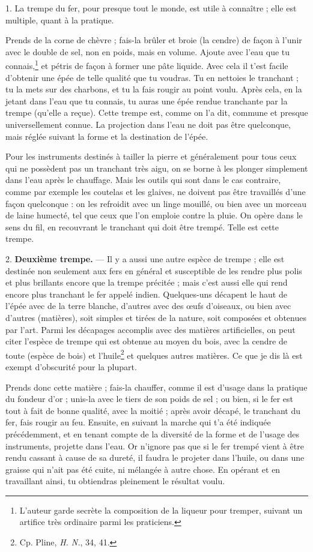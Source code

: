 \documentclass[a4paper, 11pt, oneside, polutonikogreek, french]{article}
\begin{document}
1. La trempe du fer, pour presque tout le monde, est utile à connaître ; elle est multiple, quant à la pratique.

Prends de la corne de chèvre ; fais-la brûler et broie (la cendre) de façon à l'unir avec le double de sel, non en poids, mais en volume. Ajoute avec l'eau que tu connais,\footnote{L'auteur garde secrète la composition de la liqueur pour tremper, suivant un artifice très ordinaire parmi les praticiens.} et pétris de façon à former une pâte liquide. Avec cela il t'est facile d'obtenir une épée de telle qualité que tu voudras. Tu en nettoies le tranchant ; tu la mets sur des charbons, et tu la fais rougir au point voulu. Après cela, en la jetant dans l'eau que tu connais, tu auras une épée rendue tranchante par la trempe (qu'elle a reçue). Cette trempe est, comme on l'a dit, commune et presque universellement connue. La projection dans l'eau ne doit pas être quelconque, mais réglée suivant la forme et la destination de l'épée.

Pour les instruments destinés à tailler la pierre et généralement pour tous ceux qui ne possèdent pas un tranchant très aigu, on se borne à les plonger simplement dans l'eau après le chauffage. Mais les outils qui sont dans le cas contraire, comme par exemple les coutelas et les glaives, ne doivent pas être travaillés d'une façon quelconque : on les refroidit avec un linge mouillé, ou bien avec un morceau de laine humecté, tel que ceux que l'on emploie contre la pluie. On opère dans le sens du fil, en recouvrant le tranchant qui doit être trempé. Telle est cette trempe.

2. \textbf{Deuxième trempe.} --- Il y a aussi une autre espèce de trempe ; elle est destinée non seulement aux fers en général et susceptible de les rendre plus polis et plus brillants encore que la trempe précitée ; mais c'est aussi elle qui rend encore plus tranchant le fer appelé indien. Quelques-uns décapent le haut de l'épée avec de la terre blanche, d'autres avec des œufs d'oiseaux, ou bien avec d'autres (matières), soit simples et tirées de la nature, soit composées et obtenues par l'art. Parmi les décapages accomplis avec des matières artificielles, on peut citer l'espèce de trempe qui est obtenue au moyen du bois, avec la cendre de toute (espèce de bois) et l'huile\footnote{Cp. Pline, \emph{H. N.}, 34, 41.} et quelques autres matières. Ce que je dis là est exempt d'obscurité pour la plupart.

Prends donc cette matière ; fais-la chauffer, comme il est d'usage dans la pratique du fondeur d'or ; unis-la avec le tiers de son poids de sel ; ou bien, si le fer est tout à fait de bonne qualité, avec la moitié ; après avoir décapé, le tranchant du fer, fais rougir au feu. Ensuite, en suivant la marche qui t'a été indiquée précédemment, et en tenant compte de la diversité de la forme et de l'usage des instruments, projette dans l'eau. Or n'ignore pas que si le fer trempé vient à être rendu cassant à cause de sa dureté, il faudra le projeter dans l'huile, ou dans une graisse qui n'ait pas été cuite, ni mélangée à autre chose. En opérant et en travaillant ainsi, tu obtiendras pleinement le résultat voulu.
\end{document}
